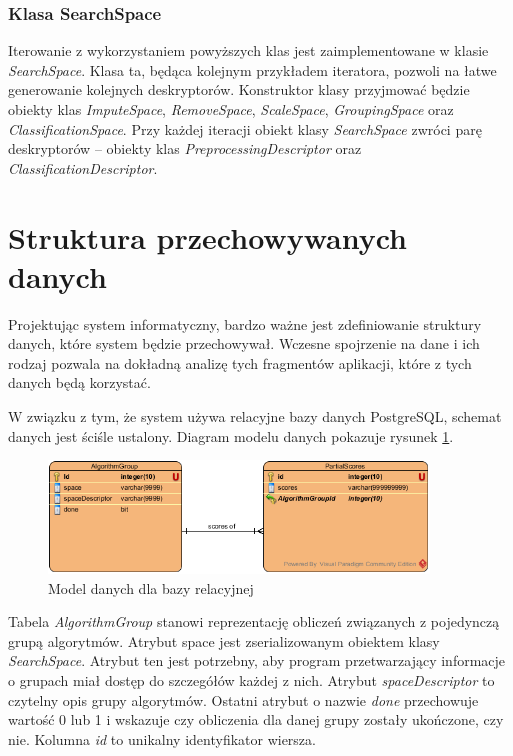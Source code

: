 \documentclass[../thesis.tex]{subfiles}
\begin{document}
\subsubsection{Klasa SearchSpace}

Iterowanie z wykorzystaniem powyższych klas jest zaimplementowane w klasie \emph{SearchSpace}. Klasa ta, będąca kolejnym przykładem iteratora, pozwoli na łatwe generowanie kolejnych deskryptorów. Konstruktor klasy przyjmować będzie obiekty klas \emph{ImputeSpace}, \emph{RemoveSpace}, \emph{ScaleSpace}, \emph{GroupingSpace} oraz \emph{ClassificationSpace}. Przy każdej iteracji obiekt klasy \emph{SearchSpace} zwróci parę deskryptorów -- obiekty klas \emph{PreprocessingDescriptor} oraz \emph{ClassificationDescriptor}.

\section{Struktura przechowywanych danych}

Projektując system informatyczny, bardzo ważne jest zdefiniowanie struktury danych, które system będzie przechowywał. Wczesne spojrzenie na dane i ich rodzaj pozwala na dokładną analizę tych fragmentów aplikacji, które z tych danych będą korzystać. 

W związku z tym, że system używa relacyjne bazy danych PostgreSQL, schemat danych jest ściśle ustalony. Diagram modelu danych pokazuje rysunek \ref{proj:diagram_data}.

\begin{figure}[h]
\centering
\includegraphics[width=0.9\textwidth]{data_diagram.png}
\caption{Model danych dla bazy relacyjnej}
\label{proj:diagram_data}
\end{figure}

Tabela \emph{AlgorithmGroup} stanowi reprezentację obliczeń związanych z pojedynczą grupą algorytmów. Atrybut space jest zserializowanym obiektem klasy \emph{SearchSpace}. Atrybut ten jest potrzebny, aby program przetwarzający informacje o grupach miał dostęp do szczegółów każdej z nich. Atrybut \emph{spaceDescriptor} to czytelny opis grupy algorytmów. Ostatni atrybut o nazwie \emph{done} przechowuje wartość 0 lub 1 i wskazuje czy obliczenia dla danej grupy zostały ukończone, czy nie. Kolumna \emph{id} to unikalny identyfikator wiersza.
\end{document}
